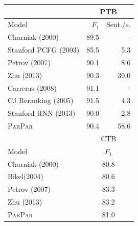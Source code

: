 \documentclass[11pt,letterpaper]{article}
\newcommand{\ParseName}{\textsc{ParPar}\xspace}
\begin{document}
\begin{table}
  \centering
  \small

  \begin{tabular}{|l|rr|}
    \hline
    & \multicolumn{2}{|c|}{PTB} \\
    \hline

    \hline
    Model & $F_1$ & Sent./s.\\
    \hline
    Charniak (2000)     &   89.5 &  -  \\
    Stanford PCFG (2003)     &   85.5 & 5.3  \\
    Petrov (2007)       &   90.1 & 8.6  \\
    Zhu (2013)           &   90.3 & 39.0 \\
    Carreras (2008)      &   91.1 & -    \\
\hline
    CJ Reranking (2005)      &   91.5 & 4.3  \\
    Stanford RNN (2013)       &   90.0 & 2.8  \\ 
\hline
    \ParseName        &   90.4 & 58.6 \\
    \hline


    \hline
     & \multicolumn{2}{|c|}{CTB} \\
    \hline

    \hline
    Model & \multicolumn{2}{|c|}{$F_1$}  \\
    \hline
    Charniak (2000)     &   \multicolumn{2}{|c|}{80.8}   \\
    Bikel(2004)     &    \multicolumn{2}{|c|}{80.6} \\
    Petrov (2007)       &   \multicolumn{2}{|c|}{83.3}  \\
    Zhu (2013)           &   \multicolumn{2}{|c|}{83.2} \\
    \hline
    \ParseName        &   \multicolumn{2}{|c|}{81.0} \\
    \hline
  \end{tabular}



\end{table}
\end{document}
